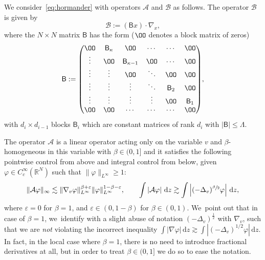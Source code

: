 \documentclass[JEP,XML,SOM,Unicode,NoFloatCountersInSection,published]{cedram}
\let\epsilon\varepsilon
\theoremstyle{definition}
\newcommand\R{{\mathbb R}}
\newcommand{\cA}{{\mathcal A}}
\newcommand{\cB}{{\mathcal B}}
\newcommand{\sB}{{\mathsf B}}
\newcommand{\dd}{{\, \mathrm d}}
\begin{document}
We consider~\eqref{eq:hormander} with operators $\cA$ and $\cB$
as follows. The operator $\cB$ is given by
\begin{equation*}
\cB := (\sB x) \cdot \nabla_x,
\end{equation*}
where the $N \times N$ matrix $\sB$ has the form ($\OO$ denotes a
block matrix of zeros)
\begin{equation} \label{B_0}\arraycolsep5.5pt
\sB
:=
\begin{pmatrix}
\OO & \sB_\kappa & \OO & \cdots & \cdots & \OO \\
\vdots & \OO & \sB_{\kappa-1} & \OO & \cdots & \OO\\
\vdots & \vdots & \OO & \ddots & \OO & \OO \\
\vdots & \vdots & \vdots & \ddots & \sB_2 & \OO \\
\vdots & \vdots & \vdots & \vdots & \OO & \sB_1 \\
\OO & \OO & \cdots & \cdots & \cdots & \OO
\end{pmatrix}\!,
\end{equation}
with $d_{i} \times d_{i-1}$ blocks $\sB_i$ which are constant
matrices of rank $d_i$ with $|\sB|\leq \Lambda$.

The operator $\cA$ is a linear operator acting only on the
variable $v$ and $\beta$\nobreakdash-homogeneous in this variable with
$\beta \in (0,1]$ and it satisfies the following pointwise
control from above and integral control from below, given
$\varphi \in C^\infty_c(\R^N)$ such that $\| \varphi \|_{L^\infty}\geq 1$:
\begin{equation}
\label{eq:hypA}
\| \cA \varphi \|_\infty \lesssim \| \nabla_{v} \varphi
\|_{L^\infty} ^{\beta+\epsilon} \| \varphi \|_{L^\infty} ^{1-\beta-\epsilon}, \qquad
\int \left| \cA \varphi \right| \dd z \gtrsim
\int \left| (-\Delta_v)^{\sfrac{\beta}{2}} \varphi \right| \dd z,
\end{equation}
where $\epsilon = 0$ for $\beta = 1$, and $\epsilon \in (0, 1-\beta)$ for $\beta \in (0, 1)$. We~point out that in case of $\beta = 1$, we~identify with a slight abuse of notation $(-\Delta_{v})^{\frac{1}{2}}$ with $\nabla_{v}$, such that we are \textit{not} violating the incorrect inequality $\int \left| \nabla \varphi\right| \dd z \gtrsim \int \left| (-\Delta_v)^{1/2} \varphi \right| \dd z$. In fact, in the local case where $\beta = 1$, there is no need to introduce fractional derivatives at all, but in order to treat $\beta \in (0, 1]$ we do so to ease the notation.
\end{document}
